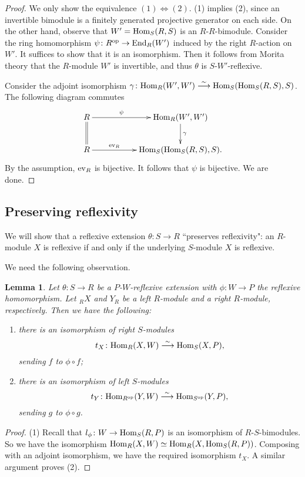 \documentclass[a4paper]{amsart}
\newtheorem{lem}[thm]{Lemma}
\theoremstyle{definition}
\theoremstyle{remark}
\numberwithin{equation}{section}
\begin{document}
\begin{proof}
We only show the equivalence $(1)\Leftrightarrow (2)$. (1) implies (2), since an invertible bimodule
is a finitely generated projective generator on each side. On the other hand, observe that $W'={\rm Hom}_S(R, S)$
is an $R$-$R$-bimodule. Consider the ring homomorphism $\psi\colon R^{\rm op}\rightarrow {\rm End}_R(W')$ induced by the right $R$-action on $W'$. It suffices to show that it is an isomorphism. Then it follows from Morita theory that the $R$-module $W'$ is invertible, and
thus $\theta$ is $S$-$W'$-reflexive.

Consider the adjoint isomorphism $\gamma\colon {\rm Hom}_R(W', W')\stackrel{\sim}\longrightarrow {\rm Hom}_S({\rm Hom}_S(R, S), S)$. The following diagram commutes
\[\xymatrix{
R\ar@{=}[d]\ar[rr]^-{\psi} && {\rm Hom}_R(W', W')\ar[d]^-{\gamma}\\
R\ar[rr]^-{{\rm ev}_R} && {\rm Hom}_S({\rm Hom}_S(R, S), S).
}\]
By the assumption, ${\rm ev}_R$ is bijective. It follows that $\psi$ is bijective. We are done.
\end{proof}

\subsection{Preserving reflexivity} We will show that a reflexive extension $\theta\colon S\rightarrow R$ ``preserves reflexivity": an $R$-module $X$ is reflexive if and only if the underlying $S$-module $X$ is reflexive.

We need the following observation.

\begin{lem}\label{lem:phi}
Let $\theta\colon S\rightarrow R$ be a $P$-$W$-reflexive extension with $\phi\colon W\rightarrow P$ the
reflexive homomorphism.  Let $_RX$ and $Y_R$ be a left $R$-module and a right $R$-module, respectively. Then we have  the following:
\begin{enumerate}
\item there is an isomorphism of right $S$-modules $$t_X\colon{\rm Hom}_R(X, W)\stackrel{\sim}\longrightarrow {\rm Hom}_S(X, P),$$
sending $f$ to $\phi\circ f$;
\item there is an isomorphism of left $S$-modules
$$t_Y\colon {\rm Hom}_{R^{\rm op}}(Y, W)\stackrel{\sim}\longrightarrow {{\rm Hom}_{S^{\rm op}}(Y, P)},$$
sending $g$ to $\phi\circ g$.
\end{enumerate}
\end{lem}

\begin{proof}
(1) Recall that $l_\phi\colon W\rightarrow {\rm Hom}_S(R, P)$ is an isomorphism of $R$-$S$-bimodules. So we have the  isomorphism ${\rm Hom}_R(X, W)\simeq {\rm Hom}_R(X,  {\rm Hom}_S(R, P))$. Composing with an adjoint isomorphism, we have the required isomorphism $t_X$. A similar argument proves (2).
\end{proof}
\end{document}
